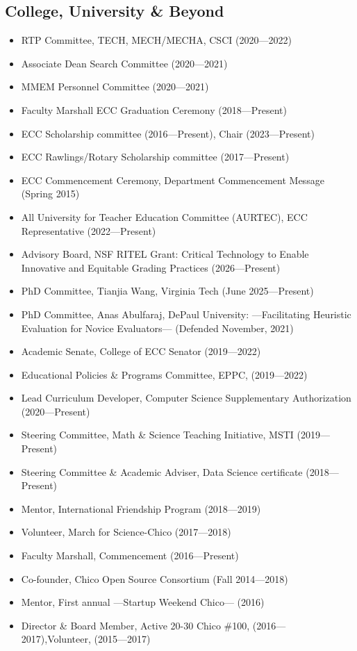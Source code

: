 \documentclass[10pt,letterpaper]{article}
\begin{document}
{\subsection*{College, University \& Beyond}
\begin{itemize}[leftmargin=1.25em]
\item RTP Committee, TECH, MECH/MECHA, CSCI (2020---2022)
\item Associate Dean Search Committee (2020---2021)
\item MMEM Personnel Committee (2020---2021)
\item Faculty Marshall ECC Graduation Ceremony (2018---Present)
\item ECC Scholarship committee (2016---Present), Chair (2023---Present)
\item ECC Rawlings/Rotary Scholarship committee (2017---Present)
\item ECC Commencement Ceremony, Department Commencement Message (Spring 2015)
\item All University for Teacher Education Committee (AURTEC), ECC Representative (2022---Present)
\item Advisory Board, NSF RITEL Grant: Critical Technology to Enable Innovative and Equitable Grading Practices (2026---Present)
\item PhD Committee, Tianjia Wang, Virginia Tech (June 2025---Present)
\item PhD Committee, Anas Abulfaraj, DePaul University: ---Facilitating Heuristic Evaluation for Novice Evaluators--- (Defended November, 2021)
\item Academic Senate, College of ECC Senator (2019---2022)
\item Educational Policies \& Programs Committee, EPPC, (2019---2022)
\item Lead Curriculum Developer, Computer Science Supplementary Authorization (2020---Present)
\item Steering Committee, Math \& Science Teaching Initiative, MSTI (2019---Present)
\item Steering Committee \& Academic Adviser, Data Science certificate (2018---Present)
\item Mentor, International Friendship Program (2018---2019)
\item Volunteer, March for Science-Chico (2017---2018)
\item Faculty Marshall, Commencement (2016---Present)
\item Co-founder, Chico Open Source Consortium (Fall 2014---2018)
\item Mentor, First annual ---Startup Weekend Chico--- (2016)
\item Director \& Board Member, Active 20-30 Chico \#100, (2016---2017),Volunteer, (2015---2017)
\end{itemize}
}
\end{document}
